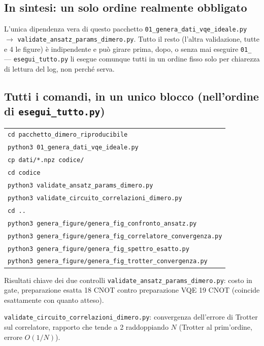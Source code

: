 \documentclass[11pt,a4paper]{article}
\newcommand{\code}[1]{\texttt{\small #1}}
\begin{document}
\subsection{In sintesi: un solo ordine realmente obbligato}

\begin{okbox}{L'unica dipendenza vera di questo pacchetto}
\code{01\_genera\_dati\_vqe\_ideale.py} $\to$
\code{validate\_ansatz\_params\_dimero.py}. Tutto il resto (l'altra
validazione, tutte e 4 le figure) è indipendente e può girare prima,
dopo, o senza mai eseguire \code{01\_} --- \code{esegui\_tutto.py} li
esegue comunque tutti in un ordine fisso solo per chiarezza di lettura
del log, non perché serva.
\end{okbox}

\subsection{Tutti i comandi, in un unico blocco (nell'ordine di \texttt{esegui\_tutto.py})}

\begin{keyeq}
\centering
\begin{tabular}{@{}l@{}}
\code{cd pacchetto\_dimero\_riproducibile}\\
\code{python3 01\_genera\_dati\_vqe\_ideale.py}\\
\code{cp dati/*.npz codice/}\\
\code{cd codice}\\
\code{python3 validate\_ansatz\_params\_dimero.py}\\
\code{python3 validate\_circuito\_correlazioni\_dimero.py}\\
\code{cd ..}\\
\code{python3 genera\_figure/genera\_fig\_confronto\_ansatz.py}\\
\code{python3 genera\_figure/genera\_fig\_correlatore\_convergenza.py}\\
\code{python3 genera\_figure/genera\_fig\_spettro\_esatto.py}\\
\code{python3 genera\_figure/genera\_fig\_trotter\_convergenza.py}\\
\end{tabular}
\end{keyeq}

\begin{okbox}{Risultati chiave dei due controlli}
\code{validate\_ansatz\_params\_dimero.py}: costo in gate, preparazione
esatta 18 CNOT contro preparazione VQE 19 CNOT (coincide esattamente
con quanto atteso).

\code{validate\_circuito\_correlazioni\_dimero.py}: convergenza
dell'errore di Trotter sul correlatore, rapporto che tende a 2
raddoppiando $N$ (Trotter al prim'ordine, errore $O(1/N)$).
\end{okbox}
\end{document}
